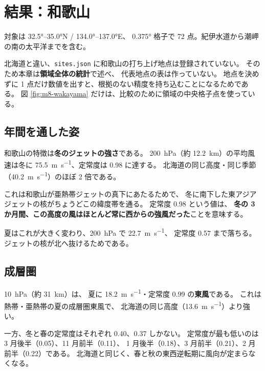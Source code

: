 \section{結果：和歌山}
\label{sec:wakayama}

対象は \ang{32.5}--\ang{35.0}N / \ang{134.0}--\ang{137.0}E、
\ang{0.375} 格子で 72 点。紀伊水道から潮岬の南の太平洋までを含む。

北海道と違い、\texttt{sites.json} に和歌山の打ち上げ地点は登録されていない。
そのため本章は\textbf{領域全体の統計}で述べ、
代表地点の表は作っていない。
地点を決めずに 1 点だけ数値を出すと、根拠のない精度を持ち込むことになるためである。
図 \ref{fig:m8-wakayama} だけは、比較のために領域の中央格子点を使っている。

\subsection{年間を通した姿}





和歌山の特徴は\textbf{冬のジェットの強さ}である。
\SI{200}{\hecto\pascal}（約 \SI{12.2}{\kilo\metre}）の平均風速は冬に
\SI{75.5}{\metre\per\second}、定常度は 0.98 に達する。
北海道の同じ高度・同じ季節（\SI{40.2}{\metre\per\second}）のほぼ 2 倍である。

これは和歌山が亜熱帯ジェットの真下にあたるためで、
冬に南下した東アジアジェットの核がちょうどこの緯度帯を通る。
定常度 0.98 という値は、
\textbf{冬の 3 か月間、この高度の風はほとんど常に西からの強風だった}ことを意味する。

夏はこれが大きく変わり、\SI{200}{\hecto\pascal} で \SI{22.7}{\metre\per\second}、
定常度 0.57 まで落ちる。ジェットの核が北へ抜けるためである。

\subsection{成層圏}




\SI{10}{\hecto\pascal}（約 \SI{31}{\kilo\metre}）は、
夏に \SI{18.2}{\metre\per\second}・定常度 0.99 の\textbf{東風}である。
これは熱帯・亜熱帯の夏の成層圏東風で、
北海道の同じ高度（\SI{13.6}{\metre\per\second}）より強い。

一方、冬と春の定常度はそれぞれ 0.40、0.37 しかない。
定常度が最も低いのは 3 月後半（0.05）、11 月前半（0.11）、
1 月後半（0.18）、3 月前半（0.21）、2 月前半（0.22）である。
北海道と同じく、春と秋の東西逆転期に風向が定まらなくなる。

